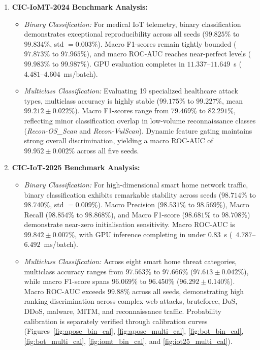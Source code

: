 \documentclass[a4paper,fleqn]{cas-sc}
\begin{document}
\begin{enumerate}
    \item \textbf{CIC-IoMT-2024 Benchmark Analysis:}
    \begin{itemize}
        \item \textit{Binary Classification:} For medical IoT telemetry, binary classification demonstrates exceptional reproducibility across all seeds ($99.825\%$ to $99.834\%$, std $= 0.003\%$). Macro F1-scores remain tightly bounded ($97.873\%$ to $97.965\%$), and macro ROC-AUC reaches near-perfect levels ($99.983\%$ to $99.987\%$). GPU evaluation completes in $11.337$--$11.649$~s (~$4.481$--$4.604$~ms/batch).
        \item \textit{Multiclass Classification:} Evaluating 19 specialized healthcare attack types, multiclass accuracy is highly stable ($99.175\%$ to $99.227\%$, mean $99.212 \pm 0.022\%$). Macro F1-scores range from $79.469\%$ to $82.291\%$, reflecting minor classification overlap in low-volume reconnaissance classes (\textit{Recon-OS\_Scan} and \textit{Recon-VulScan}). Dynamic feature gating maintains strong overall discrimination, yielding a macro ROC-AUC of $99.952 \pm 0.002\%$ across all five seeds.
    \end{itemize}

    \item \textbf{CIC-IoT-2025 Benchmark Analysis:}
    \begin{itemize}
        \item \textit{Binary Classification:} For high-dimensional smart home network traffic, binary classification exhibits remarkable stability across seeds ($98.714\%$ to $98.740\%$, std $= 0.009\%$). Macro Precision ($98.531\%$ to $98.569\%$), Macro Recall ($98.854\%$ to $98.868\%$), and Macro F1-score ($98.681\%$ to $98.708\%$) demonstrate near-zero initialisation sensitivity. Macro ROC-AUC is $99.842 \pm 0.007\%$, with GPU inference completing in under $0.83$~s (~$4.787$--$6.492$~ms/batch).
        \item \textit{Multiclass Classification:} Across eight smart home threat categories, multiclass accuracy ranges from $97.563\%$ to $97.666\%$ ($97.613 \pm 0.042\%$), while macro F1-score spans $96.069\%$ to $96.450\%$ ($96.292 \pm 0.140\%$). Macro ROC-AUC exceeds $99.88\%$ across all seeds, demonstrating high ranking discrimination across complex web attacks, bruteforce, DoS, DDoS, malware, MITM, and reconnaissance traffic. Probability calibration is separately verified through calibration curves (Figures~\ref{fig:apose_bin_cal}, \ref{fig:apose_multi_cal}, \ref{fig:bot_bin_cal}, \ref{fig:bot_multi_cal}, \ref{fig:iomt_bin_cal}, and \ref{fig:iot25_multi_cal}).
    \end{itemize}
\end{enumerate}
\end{document}
